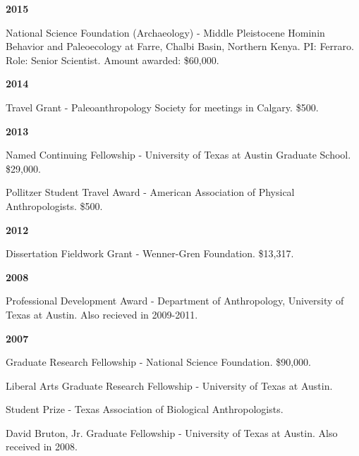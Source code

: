 \documentclass{article}
\begin{document}
\begin{description*}
\item[] {\bfseries 2015}
\item[] National Science Foundation (Archaeology) - Middle Pleistocene Hominin Behavior and Paleoecology at Farre, Chalbi Basin, Northern Kenya. PI: Ferraro. Role: Senior Scientist.  Amount awarded: \$60,000.
\end{description*}


\begin{description*}
\item[] {\bfseries 2014}
\item[] Travel Grant - Paleoanthropology Society for meetings in Calgary. \$500.
\end{description*}


\begin{description*}
\item[] {\bfseries 2013}
\item[] Named Continuing Fellowship - University of Texas at Austin Graduate School. \$29,000.
\item[] Pollitzer Student Travel Award - American Association of Physical Anthropologists. \$500.
\end{description*}


\begin{description*}
\item[] {\bfseries 2012}
\item[] Dissertation Fieldwork Grant - Wenner-Gren Foundation. \$13,317.
\end{description*}

\begin{description*}
\item[] {\bfseries 2008}
\item[] Professional Development Award - Department of Anthropology, University of Texas at Austin. Also recieved in 2009-2011.
\end{description*}

\begin{description*}
\item[] {\bfseries 2007}
\item[] Graduate Research Fellowship - National Science Foundation. \$90,000.

\item[] Liberal Arts Graduate Research Fellowship - University of Texas at Austin.

\item[] Student Prize - Texas Association of Biological Anthropologists.

\item[] David Bruton, Jr. Graduate Fellowship - University of Texas at Austin. Also received in 2008.
\end{description*}
\end{document}
